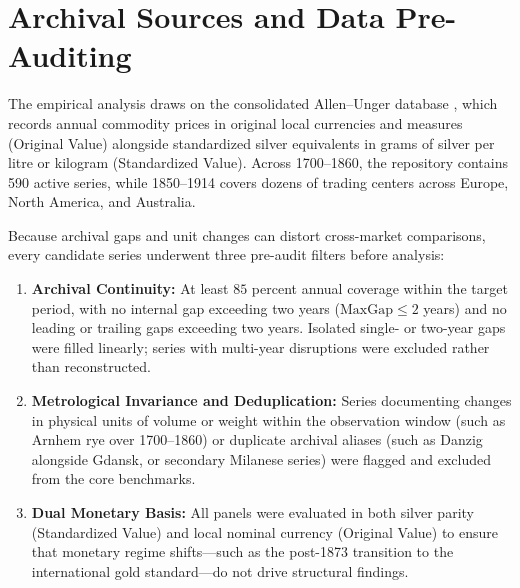 \documentclass{article}
\begin{document}
\section{Archival Sources and Data Pre-Auditing}
The empirical analysis draws on the consolidated Allen--Unger database \cite{allenunger2026}, which records annual commodity prices in original local currencies and measures (Original Value) alongside standardized silver equivalents in grams of silver per litre or kilogram (Standardized Value). Across 1700--1860, the repository contains 590 active series, while 1850--1914 covers dozens of trading centers across Europe, North America, and Australia.

Because archival gaps and unit changes can distort cross-market comparisons, every candidate series underwent three pre-audit filters before analysis:
\begin{enumerate}
    \item \textbf{Archival Continuity:} At least $85$ percent annual coverage within the target period, with no internal gap exceeding two years ($\text{MaxGap} \le 2$ years) and no leading or trailing gaps exceeding two years. Isolated single- or two-year gaps were filled linearly; series with multi-year disruptions were excluded rather than reconstructed.
    \item \textbf{Metrological Invariance and Deduplication:} Series documenting changes in physical units of volume or weight within the observation window (such as Arnhem rye over 1700--1860) or duplicate archival aliases (such as Danzig alongside Gdansk, or secondary Milanese series) were flagged and excluded from the core benchmarks.
    \item \textbf{Dual Monetary Basis:} All panels were evaluated in both silver parity (Standardized Value) and local nominal currency (Original Value) to ensure that monetary regime shifts---such as the post-1873 transition to the international gold standard---do not drive structural findings.
\end{enumerate}
\end{document}
